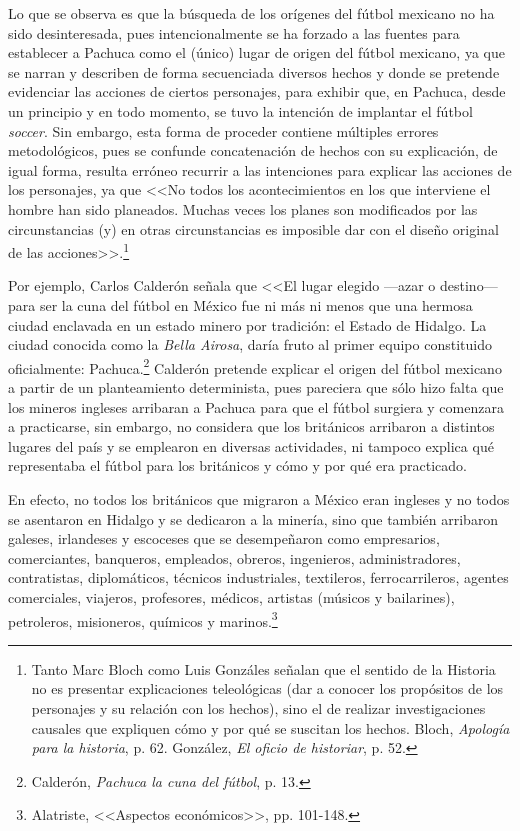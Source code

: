 \documentclass[11pt,a5paper,twoside]{book} %
\begin{document}
Lo que se observa es que la búsqueda de los orígenes del fútbol mexicano no ha sido
desinteresada, pues intencionalmente se ha forzado a las fuentes para establecer a Pachuca
como el (único) lugar de origen del fútbol mexicano, ya que se narran y describen de forma
secuenciada diversos hechos y donde se pretende evidenciar las acciones de ciertos
personajes, para exhibir que, en Pachuca, desde un principio y en todo momento, se tuvo la
intención de implantar el fútbol \emph{soccer}. Sin embargo, esta forma de proceder contiene
múltiples errores metodológicos, pues se confunde concatenación de hechos con su
explicación, de igual forma, resulta erróneo recurrir a las intenciones para explicar las acciones de los personajes, ya que <<No todos los acontecimientos en los que interviene el hombre han sido planeados. Muchas veces los planes son modificados por las circunstancias (y) en otras circunstancias es imposible dar con el diseño original de las acciones>>.\footnote{Tanto Marc Bloch como Luis Gonzáles señalan que el sentido de la Historia no es presentar explicaciones teleológicas (dar a conocer los propósitos de los personajes y su relación con los hechos), sino el de realizar investigaciones causales que expliquen cómo y por qué se suscitan los hechos. Bloch, \emph{Apología para la historia}, p. 62. González, \emph{El oficio de historiar}, p. 52.}

Por ejemplo, Carlos Calderón señala que <<El lugar elegido ---azar o destino--- para ser
la cuna del fútbol en México fue ni más ni menos que una hermosa ciudad enclavada en un estado minero por tradición: el Estado de Hidalgo. La ciudad conocida como la \emph{Bella Airosa}, daría fruto al primer equipo constituido oficialmente: Pachuca.\footnote{Calderón, \emph{Pachuca la cuna del fútbol}, p. 13.} Calderón pretende explicar el origen del fútbol mexicano a partir de un planteamiento determinista, pues pareciera que sólo hizo falta que los mineros ingleses arribaran a Pachuca para que el fútbol surgiera y comenzara a practicarse, sin embargo, no considera que los británicos arribaron a distintos lugares del país y se emplearon en diversas actividades, ni tampoco explica qué representaba el fútbol para los británicos y cómo y por qué era practicado.

En efecto, no todos los británicos que migraron a México eran ingleses y no todos se
asentaron en Hidalgo y se dedicaron a la minería, sino que también arribaron galeses,
irlandeses y escoceses que se desempeñaron como empresarios, comerciantes, banqueros,
empleados, obreros, ingenieros, administradores, contratistas, diplomáticos, técnicos
industriales, textileros, ferrocarrileros, agentes comerciales, viajeros, profesores, médicos,
artistas (músicos y bailarines), petroleros, misioneros, químicos y marinos.\footnote{Alatriste, <<Aspectos económicos>>, pp. 101-148.}
\end{document}
